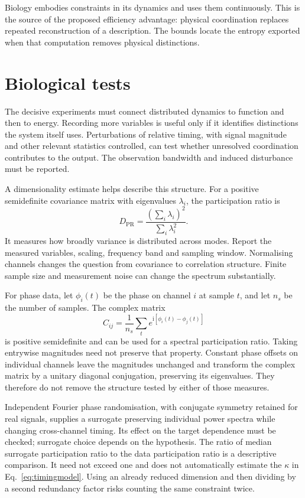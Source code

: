 \documentclass[10pt,a4paper,twocolumn]{article}
\numberwithin{equation}{section}
\begin{document}
Biology embodies constraints in its dynamics and uses them continuously. This is the source of the proposed efficiency advantage: physical coordination replaces repeated reconstruction of a description. The bounds locate the entropy exported when that computation removes physical distinctions.

\section{Biological tests}

The decisive experiments must connect distributed dynamics to function and then to energy. Recording more variables is useful only if it identifies distinctions the system itself uses. Perturbations of relative timing, with signal magnitude and other relevant statistics controlled, can test whether unresolved coordination contributes to the output. The observation bandwidth and induced disturbance must be reported.

A dimensionality estimate helps describe this structure. For a positive semidefinite covariance matrix with eigenvalues $\lambda_i$, the participation ratio is
\begin{equation}
D_{\mathrm{PR}}=
\frac{(\sum_i\lambda_i)^2}{\sum_i\lambda_i^2}.
\label{eq:pr}
\end{equation}
It measures how broadly variance is distributed across modes. Report the measured variables, scaling, frequency band and sampling window. Normalising channels changes the question from covariance to correlation structure. Finite sample size and measurement noise can change the spectrum substantially.

For phase data, let $\phi_i(t)$ be the phase on channel $i$ at sample $t$, and let $n_s$ be the number of samples. The complex matrix
\begin{equation}
C_{ij}=\frac{1}{n_s}\sum_t
e^{\mathrm{i}[\phi_i(t)-\phi_j(t)]}
\end{equation}
is positive semidefinite and can be used for a spectral participation ratio. Taking entrywise magnitudes need not preserve that property. Constant phase offsets on individual channels leave the magnitudes unchanged and transform the complex matrix by a unitary diagonal conjugation, preserving its eigenvalues. They therefore do not remove the structure tested by either of those measures.

Independent Fourier phase randomisation, with conjugate symmetry retained for real signals, supplies a surrogate preserving individual power spectra while changing cross-channel timing. Its effect on the target dependence must be checked; surrogate choice depends on the hypothesis. The ratio of median surrogate participation ratio to the data participation ratio is a descriptive comparison. It need not exceed one and does not automatically estimate the $\kappa$ in Eq.~\eqref{eq:timingmodel}. Using an already reduced dimension and then dividing by a second redundancy factor risks counting the same constraint twice.
\end{document}
